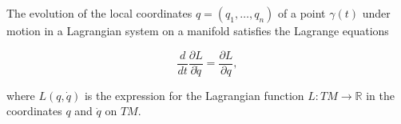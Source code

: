 The evolution of the local coordinates $q = (q_1, \ldots, q_n)$ of a point $\gamma(t)$ under motion in a Lagrangian system on a manifold satisfies the Lagrange equations

$$\frac{d}{dt} \frac{\partial L}{\partial \dot{q}} = \frac{\partial L}{\partial q},$$

where $L(q, \dot{q})$ is the expression for the Lagrangian function $L: TM \rightarrow \mathbb{R}$ in the coordinates $q$ and $\dot{q}$ on $TM$.
